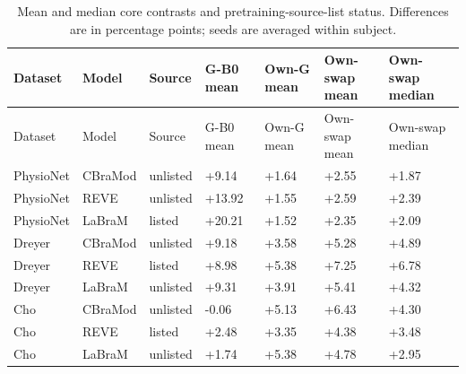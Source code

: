 \begin{longtable}{lllllll}
\caption{Mean and median core contrasts and pretraining-source-list status. Differences are in percentage points; seeds are averaged within subject.}\label{tab:cross_model_effects}\\
\toprule
Dataset & Model & Source & G-B0 mean & Own-G mean & Own-swap mean & Own-swap median \\
\midrule
\endfirsthead
\toprule
Dataset & Model & Source & G-B0 mean & Own-G mean & Own-swap mean & Own-swap median \\
\midrule
\endhead
PhysioNet & CBraMod & unlisted & +9.14 & +1.64 & +2.55 & +1.87 \\
PhysioNet & REVE & unlisted & +13.92 & +1.55 & +2.59 & +2.39 \\
PhysioNet & LaBraM & listed & +20.21 & +1.52 & +2.35 & +2.09 \\
Dreyer & CBraMod & unlisted & +9.18 & +3.58 & +5.28 & +4.89 \\
Dreyer & REVE & listed & +8.98 & +5.38 & +7.25 & +6.78 \\
Dreyer & LaBraM & unlisted & +9.31 & +3.91 & +5.41 & +4.32 \\
Cho & CBraMod & unlisted & -0.06 & +5.13 & +6.43 & +4.30 \\
Cho & REVE & listed & +2.48 & +3.35 & +4.38 & +3.48 \\
Cho & LaBraM & unlisted & +1.74 & +5.38 & +4.78 & +2.95 \\
\bottomrule
\end{longtable}
